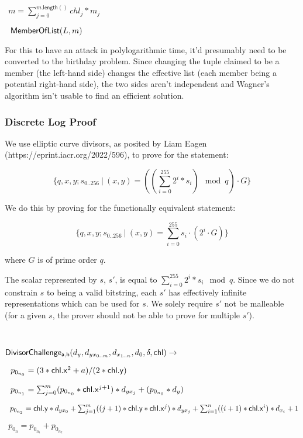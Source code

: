 \documentclass[]{article}
\begin{document}
$~~m = \sum^{m\mathsf{.length}()}_{j=0} chl_j * m_j$

$~~\mathsf{MemberOfList}(L, m)$

For this to have an attack in polylogarithmic time, it'd presumably need to be converted to the birthday problem. Since changing the tuple claimed to be a member (the left-hand side) changes the effective list (each member being a potential right-hand side), the two sides aren't independent and Wagner's algorithm isn't usable to find an efficient solution.

\newpage

\subsubsection{Discrete Log Proof}

We use elliptic curve divisors, as posited by Liam Eagen (https://eprint.iacr.org/2022/596), to prove for the statement:

$$
\{ q, x, y; s_{0..256} ~|~ (x, y) = ((\sum^{255}_{i=0} 2^i * s_i) \mod q) \cdot G \}
$$

We do this by proving for the functionally equivalent statement:

$$
\{ q, x, y; s_{0..256} ~|~ (x, y) = \sum^{255}_{i=0} s_i \cdot (2^i \cdot G) \}
$$

where $G$ is of prime order $q$.

The scalar represented by $s$, $s'$, is equal to $\sum^{255}_{i=0} 2^i * s_i \mod q$. Since we do not constrain $s$ to being a valid bitstring, each $s'$ has effectively infinite representations which can be used for $s$. We solely require $s'$ not be malleable (for a given $s$, the prover should not be able to prove for multiple $s'$).

\

\newcommand{\dloglhs}{\mathsf{DivisorChallenge_{a,b}}}

$\dloglhs(d_y, d_{yx_{0..m}}, d_{x_{1..n}}, d_0, \delta, \chl) \rightarrow$

$~~p_{0_{n_0}} = (3 * \mathsf{chl}\mathsf{.x}^2 + a) / (2 * \mathsf{chl}\mathsf{.y})$

$~~p_{0_{n_1}} = \sum^m_{j=0} (p_{0_{n_0}} * \mathsf{chl}\mathsf{.x}^{j+1}) * d_{yx_j} + (p_{0_{n_0}} * d_y)$

$~~p_{0_{n_2}} = \mathsf{chl}\mathsf{.y} * d_{yx_0} + \sum^m_{j=1} ((j+1) * \mathsf{chl}\mathsf{.y} * \mathsf{chl}\mathsf{.x}^j) * d_{yx_j} + \sum^n_{i=1} ((i+1) * \mathsf{chl}\mathsf{.x}^i) * d_{x_i} + 1$

$~~p_{0_n} = p_{0_{n_1}} + p_{0_{n_2}}$
\end{document}

